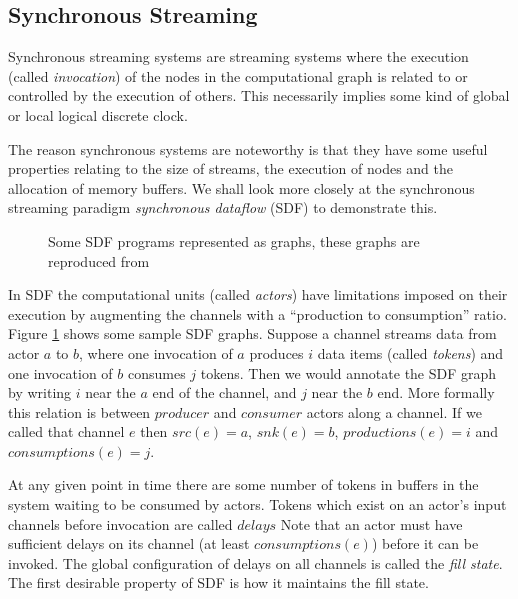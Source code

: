 \subsection{Synchronous Streaming}
\label{BACK_SYNC}

Synchronous streaming systems are streaming systems where the execution (called {\em invocation}) of the nodes in the computational graph is related to or controlled by the execution of others.
This necessarily implies some kind of global or local logical discrete clock.

The reason synchronous systems are noteworthy is that they have some useful properties relating to the size of streams, the execution of nodes and the allocation of memory buffers.
We shall look more closely at the synchronous streaming paradigm {\em synchronous dataflow} (SDF) to demonstrate this.

\begin{figure}
\begin{center}
	
\caption{Some SDF programs represented as graphs, these graphs are reproduced from \cite{sdfBook}}
\label{figSimpleSDF}
\end{center}
\end{figure}

In SDF the computational units (called {\em actors}) have limitations imposed on their execution by augmenting the channels with a ``production to consumption'' ratio.
Figure \ref{figSimpleSDF} shows some sample SDF graphs.
Suppose a channel streams data from actor $a$ to $b$, where one invocation of $a$ produces $i$ data items (called {\em tokens}) and one invocation of $b$ consumes $j$ tokens.
Then we would annotate the SDF graph by writing $i$ near the $a$ end of the channel, and $j$ near the $b$ end.
More formally this relation is between $producer$ and $consumer$ actors along a channel.
If we called that channel $e$ then $src(e) = a$, $snk(e) = b$, $productions(e) = i$ and $consumptions(e) = j$.

At any given point in time there are some number of tokens in buffers in the system waiting to be consumed by actors.
Tokens which exist on an actor's input channels before invocation are called $delays$
Note that an actor must have sufficient delays on its channel (at least $consumptions(e)$) before it can be invoked.
The global configuration of delays on all channels is called the {\em fill state}.
The first desirable property of SDF is how it maintains the fill state.

